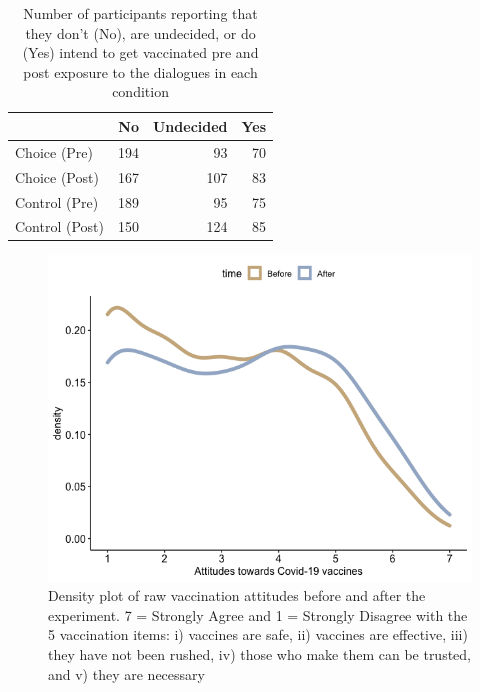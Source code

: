 \documentclass[
  english,
  ,jou,floatsintext]{apa6}
\begin{document}
\begin{table}

\caption{\label{tab:intchange}Number of participants reporting that they don't (No), are undecided, or do (Yes) intend to get vaccinated pre and post exposure to the dialogues in each condition}
\centering
\begin{tabular}[t]{l|r|r|r}
\hline
  & No & Undecided & Yes\\
\hline
Choice (Pre) & 194 & 93 & 70\\
\hline
Choice (Post) & 167 & 107 & 83\\
\hline
Control (Pre) & 189 & 95 & 75\\
\hline
Control (Post) & 150 & 124 & 85\\
\hline
\end{tabular}
\end{table}

\begin{figure}

{\centering \includegraphics[width=1\linewidth]{../plots/raw_density} 

}

\caption{Density plot of raw vaccination attitudes before and after the experiment. 7 = Strongly Agree and 1 = Strongly Disagree with the 5 vaccination items: i) vaccines are safe, ii) vaccines are effective, iii) they have not been rushed, iv) those who make them can be trusted, and v) they are necessary}\label{fig:rawdensity}
\end{figure}
\end{document}
